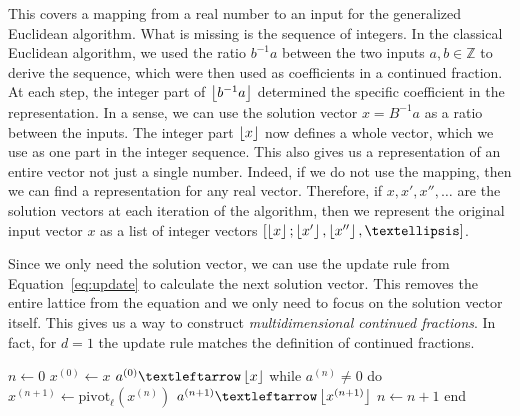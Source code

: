 

This covers a mapping from a real number to an input for the generalized Euclidean algorithm.
What is missing is the sequence of integers.
In the classical Euclidean algorithm,
we used the ratio $b^{-1}a$ between the two inputs $a, b ∈ ℤ$ to derive the sequence,
which were then used as coefficients in a continued fraction.
At each step, the integer part of $\left\lfloor b^{-1} a\right\rfloor$ determined the specific
coefficient in the representation.
In a sense, we can use the solution vector $x = B^{-1} a$ as a ratio between the inputs.
The integer part $\left\lfloor x\right\rfloor$ now defines a whole vector, which we use as
one part in the integer sequence.
This also gives us a representation of an entire vector not just a single number.
Indeed, if we do not use the mapping, then we can find a representation for any real vector.
Therefore, if $x, x', x'', …$ are the solution vectors at each iteration of the algorithm,
then we represent the original input vector $x$ as a list of integer vectors
$\left[\floor{x}; \floor{x'}, \floor{x''}, …\right]$.

Since we only need the solution vector,
we can use the update rule from Equation~\ref{eq:update}
to calculate the next solution vector.
This removes the entire lattice from the equation
and we only need to focus on the solution vector itself.
This gives us a way to construct \emph{multidimensional continued fractions}.
In fact, for $d = 1$ the update rule matches the definition of continued fractions.


\begin{Pseudocode}[
    float=tbp,
    label={lst:modified-generalized-euclidean},
    caption={
      The algorithm for constructing a multidimensional continued fraction
      based on the generalized Euclidean algorithm.
      It constructs a representation for a vector $x ∈ ℝ^d$
      as a list ${[a^{(0)}; a^{(1)}, …]}$ with $a^{(n)} ∈ ℤ^d$
      using the pivot operation from Equation~\ref{eq:modified-update-rule}.
    }]
$n ← 0$
$x^{(0)} ← x$
$a^{(0)} ← \floor{x}$
while $a^{(n)} ≠ 0$ do
  $x^{(n+1)} ← \mathrm{pivot}_ℓ(x^{(n)})$
  $a^{(n+1)} ← \floor{x^{(n+1)}}$
  $n ← n + 1$
end
\end{Pseudocode}


